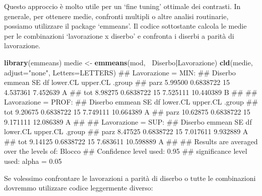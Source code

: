 \documentclass[a4paper,12pt,oneside]{book}
\newenvironment{Shaded}{\begin{snugshade}}{\end{snugshade}}
\newcommand{\KeywordTok}[1]{\textcolor[rgb]{0.13,0.29,0.53}{\textbf{#1}}}
\newcommand{\DataTypeTok}[1]{\textcolor[rgb]{0.13,0.29,0.53}{#1}}
\newcommand{\StringTok}[1]{\textcolor[rgb]{0.31,0.60,0.02}{#1}}
\newcommand{\OperatorTok}[1]{\textcolor[rgb]{0.81,0.36,0.00}{\textbf{#1}}}
\newcommand{\NormalTok}[1]{#1}
\theoremstyle{definition}
\theoremstyle{definition}
\theoremstyle{definition}
\theoremstyle{remark}
\begin{document}
Questo approccio è molto utile per un `fine tuning' ottimale dei
contrasti. In generale, per ottenere medie, confronti multipli o altre
analisi routinarie, possiamo utilizzare il package `emmeans'. Il codice
sottostante calcola le medie per le combinazioni `lavorazione x diserbo'
e confronta i diserbi a parità di lavorazione.

\begin{Shaded}
\begin{Highlighting}[]
\KeywordTok{library}\NormalTok{(emmeans)}
\NormalTok{medie <-}\StringTok{ }\KeywordTok{emmeans}\NormalTok{(mod, }\OperatorTok{~}\NormalTok{Diserbo}\OperatorTok{|}\NormalTok{Lavorazione)}
\KeywordTok{cld}\NormalTok{(medie, }\DataTypeTok{adjust=}\StringTok{"none"}\NormalTok{, }\DataTypeTok{Letters=}\NormalTok{LETTERS)}
\NormalTok{## Lavorazione = MIN:}
\NormalTok{##  Diserbo   emmean        SE df lower.CL  upper.CL .group}
\NormalTok{##  parz     5.99500 0.6838722 15 4.537361  7.452639  A    }
\NormalTok{##  tot      8.98275 0.6838722 15 7.525111 10.440389   B   }
\NormalTok{## }
\NormalTok{## Lavorazione = PROF:}
\NormalTok{##  Diserbo   emmean        SE df lower.CL  upper.CL .group}
\NormalTok{##  tot      9.20675 0.6838722 15 7.749111 10.664389  A    }
\NormalTok{##  parz    10.62875 0.6838722 15 9.171111 12.086389  A    }
\NormalTok{## }
\NormalTok{## Lavorazione = SUP:}
\NormalTok{##  Diserbo   emmean        SE df lower.CL  upper.CL .group}
\NormalTok{##  parz     8.47525 0.6838722 15 7.017611  9.932889  A    }
\NormalTok{##  tot      9.14125 0.6838722 15 7.683611 10.598889  A    }
\NormalTok{## }
\NormalTok{## Results are averaged over the levels of: Blocco }
\NormalTok{## Confidence level used: 0.95 }
\NormalTok{## significance level used: alpha = 0.05}
\end{Highlighting}
\end{Shaded}

Se volessimo confrontare le lavorazioni a parità di diserbo o tutte le
combinazioni dovremmo utilizzare codice leggermente diverso:
\end{document}
